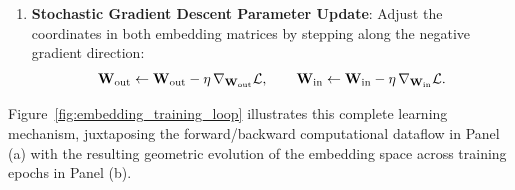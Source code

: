 \documentclass[../../../main.tex]{subfiles}
\begin{document}
\begin{enumerate}
\begin{equation}
    \nabla_{\mW_{\text{out}}} \Loss = \vh \, \boldsymbol{\delta}^\top \in \R^{d \times V}, \quad \nabla_\vh \Loss = \mW_{\text{out}} \boldsymbol{\delta} \in \R^d, \quad \nabla_{\mW_{\text{in}}} \Loss = (\nabla_\vh \Loss) \, \ve_{\text{context}}^\top \in \R^{d \times V}.
    \end{equation}
    \item \textbf{Stochastic Gradient Descent Parameter Update}: Adjust the coordinates in both embedding matrices by stepping along the negative gradient direction:
    \begin{equation}
    \label{eq:sgd_updates}
    \mathbf{W}_{\text{out}} \leftarrow \mathbf{W}_{\text{out}} - \eta \, \nabla_{\mathbf{W}_{\text{out}}} \mathcal{L}, \qquad \mathbf{W}_{\text{in}} \leftarrow \mathbf{W}_{\text{in}} - \eta \, \nabla_{\mathbf{W}_{\text{in}}} \mathcal{L}.
    \end{equation}
\end{enumerate}

Figure~\ref{fig:embedding_training_loop} illustrates this complete learning mechanism, juxtaposing the forward/backward computational dataflow in Panel (a) with the resulting geometric evolution of the embedding space across training epochs in Panel (b).
\end{document}
